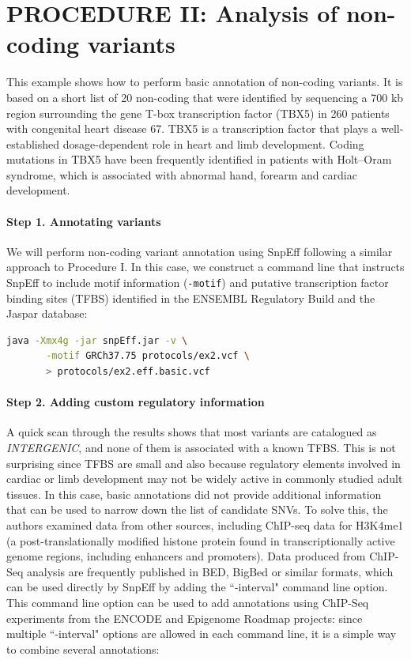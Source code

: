 \section{PROCEDURE II: Analysis of non-coding variants}

This example shows how to perform basic annotation of non-coding variants. It is based on a short list of 20 non-coding that were identified by sequencing a 700 kb region surrounding the gene T-box transcription factor (TBX5) in 260 patients with congenital heart disease 67. TBX5 is a transcription factor that plays a well-established dosage-dependent role in heart and limb development. Coding mutations in TBX5 have been frequently identified in patients with Holt–Oram syndrome, which is associated with abnormal hand, forearm and cardiac development.

\paragraph{Step 1. Annotating variants} We will perform non-coding variant annotation using SnpEff following a similar approach to Procedure I. In this case, we construct a command line that instructs SnpEff to include motif information (\texttt{-motif}) and putative transcription factor binding sites (TFBS) identified in the ENSEMBL Regulatory Build and the Jaspar database:

\begin{lstlisting}[language=bash]
java -Xmx4g -jar snpEff.jar -v \
       -motif GRCh37.75 protocols/ex2.vcf \
       > protocols/ex2.eff.basic.vcf
\end{lstlisting}

\paragraph{Step 2. Adding custom regulatory information} A quick scan through the results shows that most variants are catalogued as \textit{INTERGENIC}, and none of them is associated with a known TFBS. This is not surprising since TFBS are small and also because regulatory elements involved in cardiac or limb development may not be widely active in commonly studied adult tissues. In this case, basic annotations did not provide additional information that can be used to narrow down the list of candidate SNVs. To solve this, the authors examined data from other sources, including ChIP-seq data for H3K4me1 (a post-translationally modified histone protein found in transcriptionally active genome regions, including enhancers and promoters). Data produced from ChIP-Seq analysis are frequently published in BED, BigBed or similar formats, which can be used directly by SnpEff by adding the ``-interval" command line option. This command line option can be used to add annotations using ChIP-Seq experiments from the ENCODE and Epigenome Roadmap projects: since multiple ``-interval" options are allowed in each command line, it is a simple way to combine several annotations:

